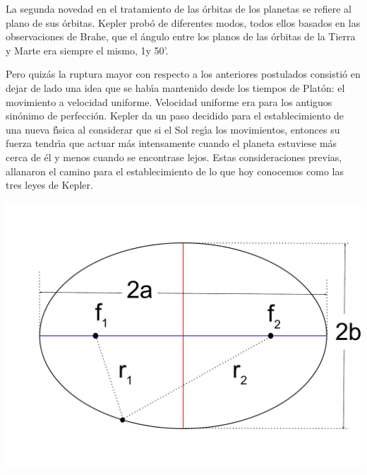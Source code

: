 La segunda novedad en el tratamiento de las \'orbitas de los planetas se refiere al plano de sus \'orbitas. Kepler prob\'o de diferentes modos, todos ellos basados en las observaciones de Brahe, que el \'angulo entre los planos de las \'orbitas de la Tierra y Marte era siempre el mismo, 1\grad y 50'. 

Pero quiz\'as la ruptura mayor con respecto a los anteriores postulados consisti\'o en dejar de lado una idea que se hab\'\i{}a mantenido desde los tiempos de Plat\'on: el movimiento a velocidad uniforme. Velocidad uniforme era para los antiguos sin\'onimo de perfecci\'on. Kepler da un paso decidido para el establecimiento de una nueva f\'\i{}sica al considerar que si el Sol reg\'\i{}a los movimientos, entonces su fuerza tendr\'\i{}a que actuar m\'as intensamente cuando el planeta estuviese m\'as cerca de \'el y menos cuando se encontrase lejos.
Estas consideraciones previas, allanaron el camino para el establecimiento de lo que hoy conocemos como las tres leyes de Kepler.


%
%

\begin{marginfigure}
  \includegraphics[width=\linewidth]{elipse.pdf}
  \caption{Los planetas recorren una elipse, seg\'un la primera ley de Kepler. El Sol se situar\'\i{}a en uno de los focos. La condici\'on que define la elipse es que la suma de las distancias de cualquiera de sus puntos a sus focos es una cantidad constante: $r_1+r_2 = 2a$.}
  \label{fig:elipse}
\end{marginfigure}

